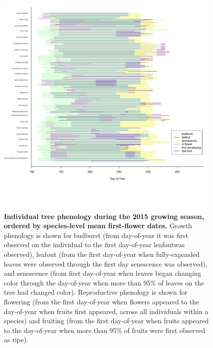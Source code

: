 \documentclass{article}
\begin{document}
\begin{figure}[h]
  \centering
  \includegraphics{../analyses/figures/grosea_repsort_ripefruit_ind_legend.pdf}
  \caption{\textbf{Individual tree phenology during the 2015 growing season, ordered by species-level mean first-flower dates.} Growth phenology is shown for budburst (from day-of-year it was first observed on the individual to the first day-of-year  leafoutwas observed), leafout (from the first day-of-year when fully-expanded leaves were observed through the first day senescence was observed), and senescence (from first day-of-year when leaves began changing color through the day-of-year when more than 95\% of leaves on the tree had changed color). Reproductive phenology is shown for flowering (from the first day-of-year when flowers appeared to the day-of-year when fruits first appeared, across all individuals within a species) and fruiting (from the first day-of-year when fruits appeared to the day-of-year when more than 95\% of fruits were first observed as ripe).}
 \label{fig:focind}
\end{figure}
\clearpage
 
\end{document}
